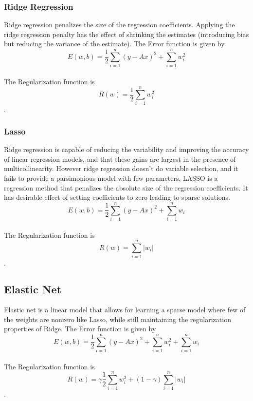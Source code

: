 \documentclass{sigplanconf}
\begin{document}
\subsubsection{Ridge Regression}
Ridge regression penalizes the size of the regression coefficients. Applying the ridge regression penalty
has the effect of shrinking the estimates (introducing bias but reducing the variance of the estimate). The Error
function is given by \\
\begin{equation} E(w,b) =\frac{1}{2} \sum_{i=1}^{n} (y-Ax)^2 + \sum_{i=1}^{n} w_i^2 \end{equation} \\
The Regularization function is
\begin{equation}R(w)=\frac{1}{2} \sum_{i=1}^{n} w_i^2\end{equation}.

\subsubsection{Lasso}
Ridge regression is capable of reducing the variability and improving the accuracy of linear regression
models, and that these gains are largest in the presence of multicollinearity. However ridge regression
doesn't do variable selection, and it fails to provide a parsimonious model with few parameters.
LASSO is a regression method that penalizes the absolute size of the regression coefficients. It has
desirable effect of setting coefficients to zero leading to sparse solutions.\\
\begin{equation} E(w,b) =\frac{1}{2} \sum_{i=1}^{n} (y-Ax)^2 + \sum_{i=1}^{n} w_i \end{equation} \\
The Regularization function is
\begin{equation}R(w)=\sum_{i=1}^{n} |w_i|\end{equation}.

\subsection{Elastic Net}
Elastic net is a linear model that allows for learning a sparse model where few of the weights are nonzero
like Lasso, while still maintaining the regularization properties of Ridge. The Error function is given by
\begin{equation}E(w,b) =\frac{1}{2} \sum_{i=1}^{n} (y-Ax)^2 + \sum_{i=1}^{n} w_i^2 + \sum_{i=1}^{n} w_i \end{equation} \\
The Regularization function is
\begin{equation}R(w) = \gamma \frac{1}{2} \sum_{i=1}^{n} w_i^2 + (1-\gamma)\sum_{i=1}^{n} |w_i|\end{equation}.
\end{document}
